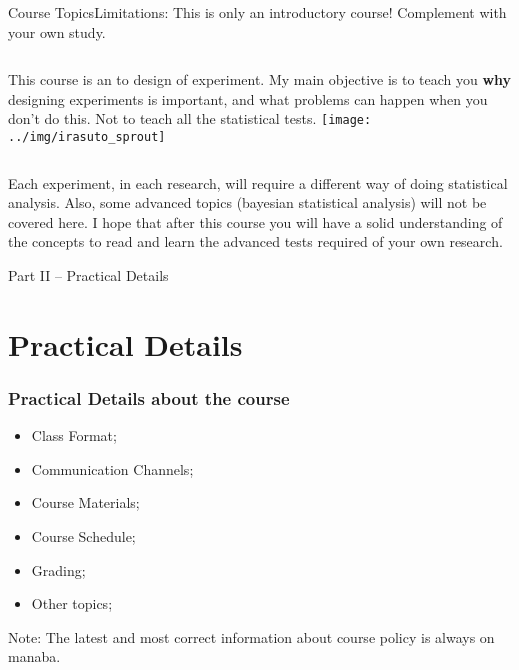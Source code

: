 \documentclass[aspectratio=169]{beamer}
\begin{document}
\begin{frame}{Course Topics}{Limitations: This is only an introductory course! Complement with your own study.}

  \begin{columns}
    This course is an  to design of
    experiment. My main objective is to teach you {\bf why} designing
    experiments is important, and what problems can happen when you
    don't do this. Not to teach all the statistical tests.
      \texttt{[image: ../img/irasuto\_sprout]}
  \end{columns}
  \vfill

  Each experiment, in each research, will require a different way of
  doing statistical analysis. Also, some advanced topics (bayesian
  statistical analysis) will not be covered here. I hope that after
  this course you will have a solid understanding of the concepts to
  read and learn the advanced tests required of your own research.
\end{frame}

\begin{frame}
  \begin{center}
    Part II -- Practical Details
  \end{center}
\end{frame}

\section{Practical Details}
\begin{frame}
  \frametitle{Practical Details about the course}
  \begin{itemize}
    \item Class Format;
    \item Communication Channels;
    \item Course Materials;
    \item Course Schedule;
    \item Grading;
    \item Other topics;
  \end{itemize}\vfill

  \alert{Note}: The latest and most correct information about course policy is always on manaba.
\end{frame}
\end{document}
